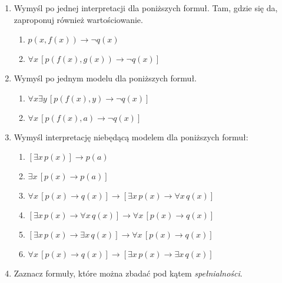 \documentclass{mwart}
\begin{document}
\begin{enumerate}
\begin{enumerate}
		\end{enumerate}
	\item Wymyśl po jednej interpretacji dla poniższych formuł. Tam, gdzie się da, zaproponuj również wartościowanie.
		\begin{multicols}{2}
			\begin{enumerate}
				\item $p(x, f(x)) \to \lnot q(x)$
				\item $\forall x\, [p(f(x), g(x)) \to \lnot q(x)]$
			\end{enumerate}
		\end{multicols}
	\item Wymyśl po jednym modelu dla poniższych formuł.
		\begin{multicols}{2}
			\begin{enumerate}
				\item $\forall x\exists y\, [p(f(x), y) \to \lnot q(x)]$
				\item $\forall x\, [p(f(x), a) \to \lnot q(x)]$
			\end{enumerate}
		\end{multicols}
	\item Wymyśl interpretację niebędącą modelem dla poniższych formuł:
		\begin{multicols}{2}
			\begin{enumerate}
				\item $\left[\exists x\, p(x)\right] \to p(a)$
				\item $\exists x\, \left[p(x) \to p(a)\right]$
				\item $\forall x\, \left[p(x) \to q(x)\right] \to \left[\exists x\, p(x)\to \forall x\,q(x)\right]$
				\item $\left[\exists x\, p(x)\to \forall x\,q(x)\right] \to \forall x\, \left[p(x) \to q(x)\right]$
				\item $\left[\exists x\, p(x)\to \exists x\, q(x)\right] \to \forall x\,\left[p(x)\to q(x)\right]$
				\item $\forall x\,\left[p(x)\to q(x)\right] \to \left[\exists x\, p(x)\to \exists x\, q(x)\right]$
			\end{enumerate}
		\end{multicols}
	\item Zaznacz formuły, które można zbadać pod kątem \emph{spełnialności}.

\end{enumerate}
\end{document}
